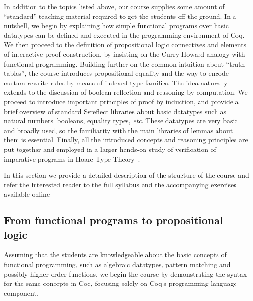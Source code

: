 \documentclass[blockstyle,preprint,nocopyrightspace]{sigplanconf}
\newcommand{\is}[1]{\textcolor{blue}{(Ilya: {#1})}}
\newcommand{\an}[1]{\textcolor{red}{(Aleks: {#1})}}
\newcommand{\etc}{\emph{etc}}
\begin{document}
In addition to the topics listed above, our course supplies some
amount of ``standard'' teaching material required to get the students
off the ground.
%
In a nutshell, we begin by explaining how simple functional programs
over basic datatypes can be defined and executed in the programming
environment of Coq. We then proceed to the definition of propositional
logic connectives and elements of interactive proof construction, by
insisting on the Curry-Howard analogy with functional programming.
%
Building further on the common intuition about ``truth
tables'', 
%
%
the course introduces propositional equality and the way to encode
custom rewrite rules by means of indexed type families. The idea
naturally extends to the discussion of boolean reflection and
reasoning by computation.  We proceed to introduce 
%
%
%
important principles of proof by induction, and provide a brief
overview of standard Ssreflect libraries about basic datatypes such as
natural numbers, booleans, equality types, \etc. These datatypes are
very basic and broadly used, so the familiarity with the main
libraries of lemmas about them is essential. Finally, all the
introduced concepts and reasoning principles are put together and
employed in a larger hands-on study of verification of imperative
programs in Hoare Type Theory~\cite{Nanevski-al:POPL10}.

In this section we provide a detailed description of the structure of
the course and refer the interested reader to the full syllabus and
the accompanying exercises available online~\cite{Sergey:PnP}.

\subsection{From functional programs to propositional logic}

Assuming that the students are knowledgeable about the basic concepts
of functional programming, such as algebraic datatypes, pattern
matching and possibly higher-order functions, we begin the course by
demonstrating the syntax for the same concepts in Coq, focusing solely
on Coq's programming language component.
\end{document}
